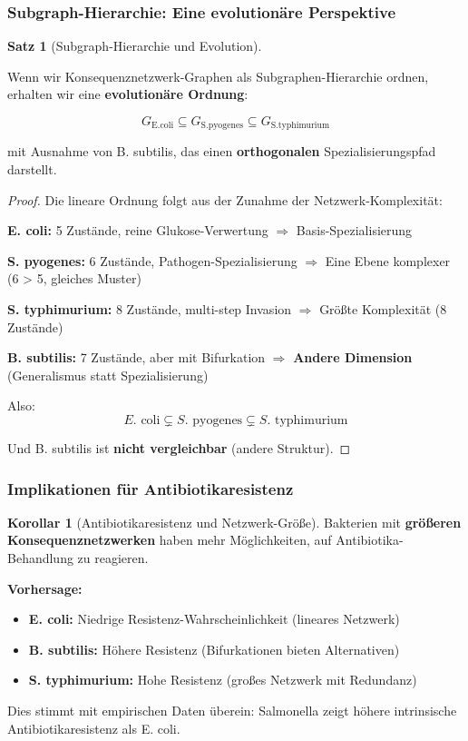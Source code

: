 \documentclass[a4paper,12pt]{article}
\theoremstyle{definition}
\newtheorem{satz}{Satz}
\newtheorem{korollar}{Korollar}
\begin{document}
\subsubsection{Subgraph-Hierarchie: Eine evolutionäre Perspektive}

\begin{satz}[Subgraph-Hierarchie und Evolution]
\label{satz:evolution_subgraph}

Wenn wir Konsequenznetzwerk-Graphen als Subgraphen-Hierarchie ordnen, erhalten wir eine \textbf{evolutionäre Ordnung}:

\[
G_{\text{E.coli}} \subseteq G_{\text{S.pyogenes}} \subseteq G_{\text{S.typhimurium}}
\]

mit Ausnahme von B. subtilis, das einen \textbf{orthogonalen} Spezialisierungspfad darstellt.
\end{satz}

\begin{proof}

Die lineare Ordnung folgt aus der Zunahme der Netzwerk-Komplexität:

\textbf{E. coli:} 5 Zustände, reine Glukose-Verwertung
  $\Rightarrow$ Basis-Spezialisierung

\textbf{S. pyogenes:} 6 Zustände, Pathogen-Spezialisierung
  $\Rightarrow$ Eine Ebene komplexer (6 > 5, gleiches Muster)

\textbf{S. typhimurium:} 8 Zustände, multi-step Invasion
  $\Rightarrow$ Größte Komplexität (8 Zustände)

\textbf{B. subtilis:} 7 Zustände, aber mit Bifurkation
  $\Rightarrow$ \textbf{Andere Dimension} (Generalismus statt Spezialisierung)

Also:
\[
E. \text{ coli} \subsetneq S. \text{ pyogenes} \subsetneq S. \text{ typhimurium}
\]

Und B. subtilis ist \textbf{nicht vergleichbar} (andere Struktur).
\end{proof}


\subsubsection{Implikationen für Antibiotikaresistenz}

\begin{korollar}[Antibiotikaresistenz und Netzwerk-Größe]

Bakterien mit \textbf{größeren Konsequenznetzwerken} haben mehr Möglichkeiten, auf Antibiotika-Behandlung zu reagieren.

\textbf{Vorhersage:}
\begin{itemize}
    \item \textbf{E. coli:} Niedrige Resistenz-Wahrscheinlichkeit (lineares Netzwerk)
    \item \textbf{B. subtilis:} Höhere Resistenz (Bifurkationen bieten Alternativen)
    \item \textbf{S. typhimurium:} Hohe Resistenz (großes Netzwerk mit Redundanz)
\end{itemize}

Dies stimmt mit empirischen Daten überein: Salmonella zeigt höhere intrinsische Antibiotikaresistenz als E. coli.

\end{korollar}
\end{document}

